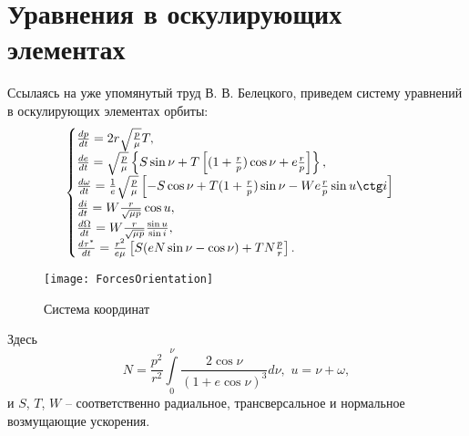\section{Уравнения в оскулирующих элементах}
\noindent\indent Ссылаясь на уже упомянутый труд В. В. Белецкого, приведем систему уравнений
в оскулирующих элементах орбиты:
\begin{equation}
  \begin{cases}
    \frac{dp}{dt} = 2r\sqrt{\frac{p}{\mu}}T, \\
    \frac{de}{dt} = \sqrt{\frac{p}{\mu}}\left\{
      S\sin\nu + T\left[(1 + \frac{r}{p})\cos\nu + e\frac{r}{p}\right]
    \right\}, \\
    \frac{d\omega}{dt} = \frac{1}{e}\sqrt{\frac{p}{\mu}}\left[
      -S\cos\nu + T(1 + \frac{r}{p})\sin\nu - W e\frac{r}{p}\sin u\ctg i
    \right] \\
    \frac{di}{dt} = W \frac{r}{\sqrt{\mu p}}\cos u, \\
    \frac{d\Omega}{dt} = W \frac{r}{\sqrt{\mu p}}\frac{\sin u}{\sin i}, \\
    \frac{d\tau^*}{dt} = \frac{r^2}{e\mu}\left[
      S (eN\sin\nu - \cos\nu) + T N\frac{p}{r}
    \right].
  \end{cases}
\end{equation}\par
\begin{figure}[h]
  \centering
  \texttt{[image: ForcesOrientation]}
  \caption{Система координат}
  \label{fig:ForcesOrientation}
\end{figure}\par
Здесь
\begin{equation}
  N = \frac{p^2}{r^2}\int\limits_0^{\nu} \frac{2\cos\nu}{(1 + e\cos\nu)^3}d\nu,\,\,
  u = \nu + \omega,
\end{equation}
и $S$, $T$, $W$ -- соответственно радиальное, трансверсальное и нормальное возмущающие
ускорения.\par
